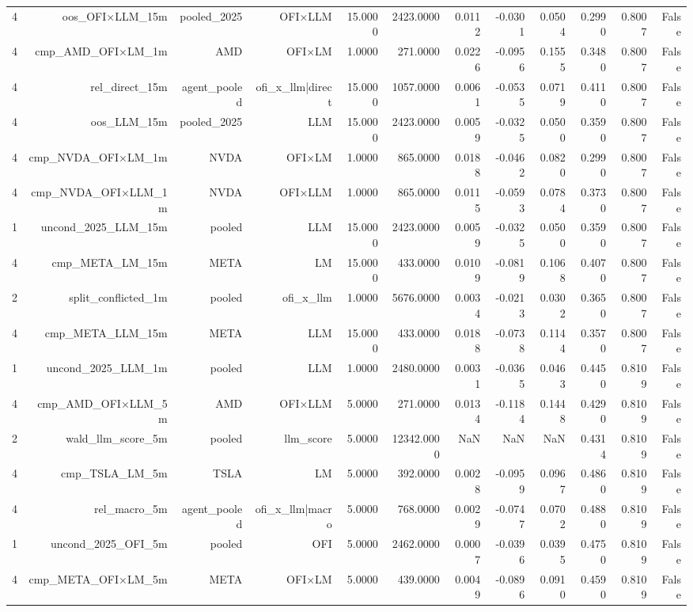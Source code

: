 \begin{table}[htbp]
\begin{tabular}{lrrrrrrrrrrr}
4 & oos\_OFI×LLM\_15m & pooled\_2025 & OFI×LLM & 15.0000 & 2423.0000 & 0.0112 & -0.0301 & 0.0504 & 0.2990 & 0.8007 & False \\
4 & cmp\_AMD\_OFI×LM\_1m & AMD & OFI×LM & 1.0000 & 271.0000 & 0.0226 & -0.0956 & 0.1555 & 0.3480 & 0.8007 & False \\
4 & rel\_direct\_15m & agent\_pooled & ofi\_x\_llm|direct & 15.0000 & 1057.0000 & 0.0061 & -0.0535 & 0.0719 & 0.4110 & 0.8007 & False \\
4 & oos\_LLM\_15m & pooled\_2025 & LLM & 15.0000 & 2423.0000 & 0.0059 & -0.0325 & 0.0500 & 0.3590 & 0.8007 & False \\
4 & cmp\_NVDA\_OFI×LM\_1m & NVDA & OFI×LM & 1.0000 & 865.0000 & 0.0188 & -0.0462 & 0.0820 & 0.2990 & 0.8007 & False \\
4 & cmp\_NVDA\_OFI×LLM\_1m & NVDA & OFI×LLM & 1.0000 & 865.0000 & 0.0115 & -0.0593 & 0.0784 & 0.3730 & 0.8007 & False \\
1 & uncond\_2025\_LLM\_15m & pooled & LLM & 15.0000 & 2423.0000 & 0.0059 & -0.0325 & 0.0500 & 0.3590 & 0.8007 & False \\
4 & cmp\_META\_LM\_15m & META & LM & 15.0000 & 433.0000 & 0.0109 & -0.0819 & 0.1068 & 0.4070 & 0.8007 & False \\
2 & split\_conflicted\_1m & pooled & ofi\_x\_llm & 1.0000 & 5676.0000 & 0.0034 & -0.0213 & 0.0302 & 0.3650 & 0.8007 & False \\
4 & cmp\_META\_LLM\_15m & META & LLM & 15.0000 & 433.0000 & 0.0188 & -0.0738 & 0.1144 & 0.3570 & 0.8007 & False \\
1 & uncond\_2025\_LLM\_1m & pooled & LLM & 1.0000 & 2480.0000 & 0.0031 & -0.0365 & 0.0463 & 0.4450 & 0.8109 & False \\
4 & cmp\_AMD\_OFI×LLM\_5m & AMD & OFI×LLM & 5.0000 & 271.0000 & 0.0134 & -0.1184 & 0.1448 & 0.4290 & 0.8109 & False \\
2 & wald\_llm\_score\_5m & pooled & llm\_score & 5.0000 & 12342.0000 & NaN & NaN & NaN & 0.4314 & 0.8109 & False \\
4 & cmp\_TSLA\_LM\_5m & TSLA & LM & 5.0000 & 392.0000 & 0.0028 & -0.0959 & 0.0967 & 0.4860 & 0.8109 & False \\
4 & rel\_macro\_5m & agent\_pooled & ofi\_x\_llm|macro & 5.0000 & 768.0000 & 0.0029 & -0.0747 & 0.0702 & 0.4880 & 0.8109 & False \\
1 & uncond\_2025\_OFI\_5m & pooled & OFI & 5.0000 & 2462.0000 & 0.0007 & -0.0396 & 0.0395 & 0.4750 & 0.8109 & False \\
4 & cmp\_META\_OFI×LM\_5m & META & OFI×LM & 5.0000 & 439.0000 & 0.0049 & -0.0896 & 0.0910 & 0.4590 & 0.8109 & False \\

\end{tabular}
\end{table}
